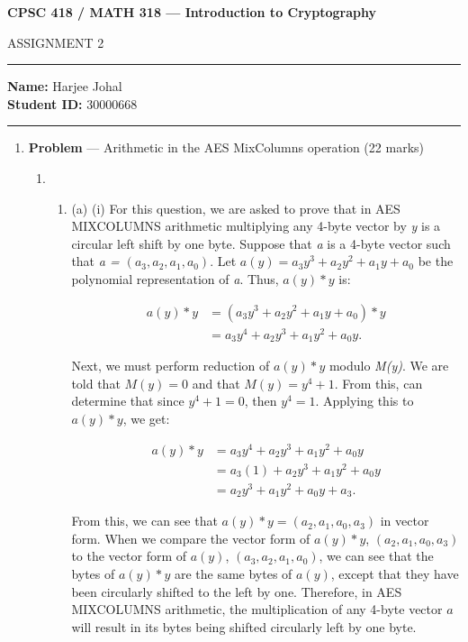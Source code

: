 \documentclass[11pt]{article}
\theoremstyle{definition}
\newcounter{problem}
\begin{document}
\begin{center}
{\bf \Large CPSC 418 / MATH 318 --- Introduction to Cryptography

ASSIGNMENT 2 }
\end{center}

\hrule 	

\textbf{Name:} Harjee Johal \\
\textbf{Student ID:} 30000668 \\

\medskip \hrule

\begin{enumerate} \itemsep 20pt

\item[] \textbf{Problem \theproblem} ---  Arithmetic in the AES {\sc MixColumns} operation (22
    marks)

\begin{enumerate}
\item \begin{enumerate}

\item (a) (i) For this question, we are asked to prove that in AES MIXCOLUMNS arithmetic multiplying any 4-byte vector by \textit{y} is a circular left shift by one byte. Suppose that \textit{a} is a 4-byte vector such that \textit{a = $(a_3, a_2, a_1, a_0)$}. Let $a(y) = a_3y^3 + a_2y^2 + a_1y + a_0$ be the polynomial representation of \textit{a}. Thus, $a(y) * y$ is:

\begin{align*}
    a(y)*y &= (a_3y^3 + a_2y^2 + a_1y + a_0)*y \\
    &= a_3y^4 + a_2y^3 + a_1y^2 + a_0y.
\end{align*}

Next, we must perform reduction of $a(y)*y$ modulo \textit{M(y)}. We are told that $M(y) = 0$ and that $M(y) = y^4 + 1$. From this, can determine that since $y^4+1 = 0$, then $y^4 = 1$. Applying this to $a(y)*y$, we get:

\begin{align*}
    a(y) * y &= a_3y^4 + a_2y^3 + a_1y^2 + a_0y \\
    &= a_3(1) + a_2y^3 + a_1y^2 + a_0y \\
    &= a_2y^3 + a_1y^2 + a_0y + a_3.
\end{align*}

From this, we can see that $a(y) * y = (a_2, a_1, a_0, a_3)$ in vector form. When we compare the vector form of $a(y)*y$, $(a_2, a_1, a_0, a_3)$ to the vector form of $a(y)$, $(a_3, a_2, a_1, a_0)$, we can see that the bytes of $a(y)*y$ are the same bytes of $a(y)$, except that they have been circularly shifted to the left by one. Therefore, in AES MIXCOLUMNS arithmetic, the multiplication of any 4-byte vector $a$ will result in its bytes being shifted circularly left by one byte.
\\


\end{enumerate}
\end{enumerate}
\end{enumerate}
\end{document}
